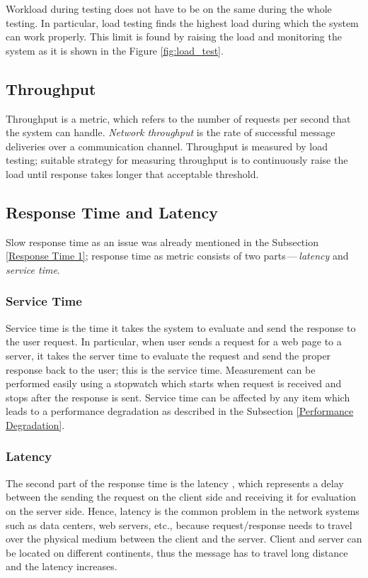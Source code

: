 Workload during testing does not have to be on the same during the whole testing. In particular, load testing finds the highest load during which the system can work properly. This limit is found by raising the load and monitoring the system as it is shown in the Figure \ref{fig:load_test}.

\subsection{Throughput}
Throughput is a metric, which refers to the number of requests per second that the system can handle. \emph{Network throughput} is the rate of successful message deliveries over a communication channel. Throughput is measured by load testing; suitable strategy for measuring throughput is to continuously raise the load until response takes longer that acceptable threshold.

\subsection{Response Time and Latency}
Slow response time as an issue was already mentioned in the Subsection \ref{Response Time 1}; response time as metric consists of two parts\,---\,\emph{latency} and \emph{service time}.

\subsubsection*{Service Time}
Service time is the time it takes the system to evaluate and send the response to the user request. In particular, when user sends a request for a web page to a server, it takes the server time to evaluate the request and send the proper response back to the user; this is the service time. Measurement can be performed easily using a stopwatch which starts when request is received and stops after the response is sent. Service time can be affected by any item which leads to a performance degradation as described in the Subsection \ref{Performance Degradation}.

\subsubsection*{Latency}
The second part of the response time is the latency \cite{Broadwell:RPT, BHATT:PERF}, which represents a delay between the sending the request on the client side and receiving it for evaluation on the server side. Hence, latency is the common problem in the network systems such as data centers, web servers, etc., because request/response needs to travel over the physical medium between the client and the server. Client and server can be located on different continents, thus the message has to travel long distance and the latency increases.

